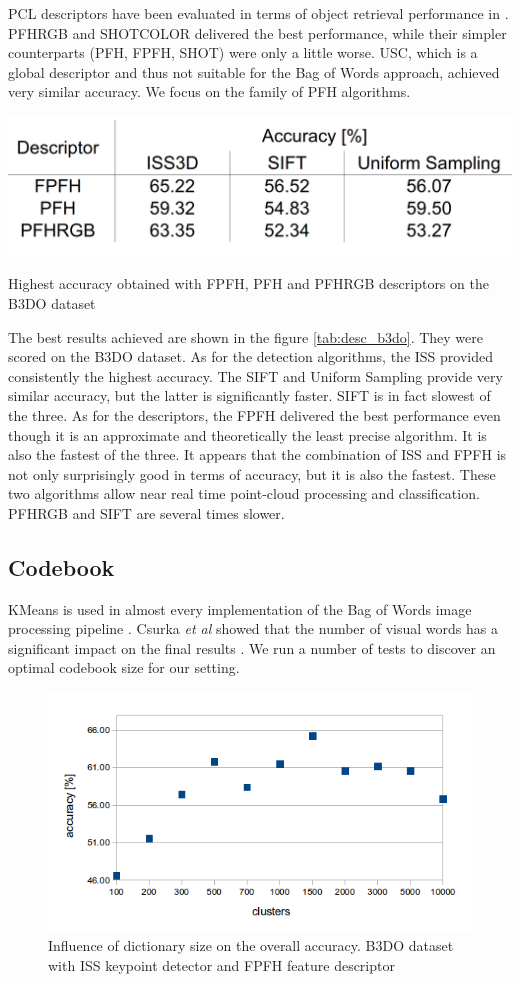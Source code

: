	PCL descriptors have been evaluated in terms of object retrieval performance in \cite{pcl_features}. PFHRGB and SHOTCOLOR delivered the best performance, while their simpler counterparts (PFH, FPFH, SHOT) were only a little worse. USC, which is a global descriptor and thus not suitable for the Bag of Words approach, achieved very similar accuracy. We focus on the family of PFH algorithms.
	
	\begin{table}[!ht]
	\centering	
	\includegraphics[width=.55\textwidth]{figs/desc_b3do}
	\caption{Highest accuracy obtained with FPFH, PFH and PFHRGB descriptors on the B3DO dataset}
	\label{tab:desc_b3do}
	\end{table}
	
	The best results achieved are shown in the figure \ref{tab:desc_b3do}. They were scored on the B3DO dataset. As for the detection algorithms, the ISS provided consistently the highest accuracy. The SIFT and Uniform Sampling provide very similar accuracy, but the latter is significantly faster. SIFT is in fact slowest of the three. As for the descriptors, the FPFH delivered the best performance even though it is an approximate and theoretically the least precise algorithm. It is also the fastest of the three. It appears that the combination of ISS and FPFH is not only surprisingly good in terms of accuracy, but it is also the fastest. These two algorithms allow near real time point-cloud processing and classification. PFHRGB and SIFT are several times slower.
		
	\subsection{Codebook}
	KMeans is used in almost every implementation of the Bag of Words image processing pipeline \cite{tsai2012bag, toldo2009bag}. Csurka \emph{et al} showed that the number of visual words has a significant impact on the final results \cite{csurka2004visual}. We run a number of tests to discover an optimal codebook size for our setting.
	
	\begin{figure}[!ht]
	\centering	
	\includegraphics[width=.75\textwidth]{figs/clustering_centroids_b3do}
	\caption{Influence of dictionary size on the overall accuracy. B3DO dataset with ISS keypoint detector and FPFH feature descriptor}
	\label{fig:cluster_b3do}
	\end{figure}
	
